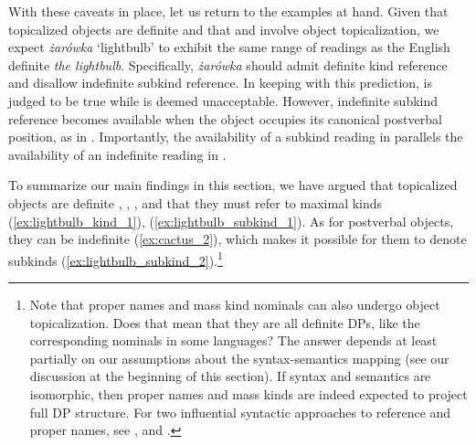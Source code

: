 \documentclass[output=paper]{langscibook}
\begin{document}

\z \z

\noindent
With these caveats in place, let us return to the examples at hand. Given that topicalized objects are definite and that  and  involve object topicalization, we expect \textit{żarówka} `lightbulb' to exhibit the same range of readings as the English definite \textit{the lightbulb}. Specifically, \textit{żarówka} should admit definite kind reference and disallow indefinite subkind reference. In keeping with this prediction,  is judged to be true while  is deemed unacceptable. However, indefinite subkind reference becomes available when the object occupies its canonical postverbal position, as in . Importantly, the availability of a subkind reading in  parallels the availability of an indefinite reading in .


To summarize our main findings in this section, we have argued that topicalized objects are definite , , , and that they must refer to maximal kinds (\ref{ex:lightbulb_kind_1}), (\ref{ex:lightbulb_subkind_1}). As for postverbal objects, they  can be indefinite (\ref{ex:cactus_2}), which makes it possible for them to denote subkinds (\ref{ex:lightbulb_subkind_2}).\footnote{Note that proper names and mass kind nominals can also undergo object topicalization. Does that mean that they are all definite DPs, like the corresponding nominals in some  languages? The answer depends at least partially on our assumptions about the syntax-semantics mapping (see our discussion at the beginning of this section). If syntax and semantics are isomorphic, then proper names and mass kinds are indeed expected to project full DP structure. For two influential syntactic approaches to reference and proper names, see \citet{Longobardi1994,Longobardi2001,Longobardi2005}, and \citet{Borer2005}.}
\end{document}
